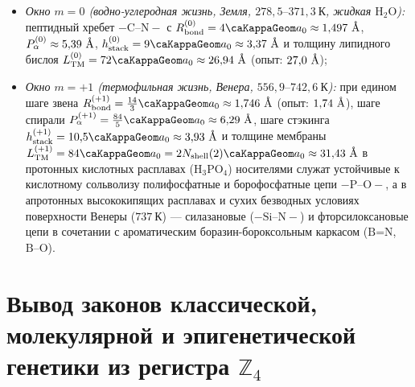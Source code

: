 \begin{theorem}
\begin{enumerate}[leftmargin=*]
\begin{itemize}[noitemsep]
  \item \emph{Окно $m=0$ (водно-углеродная жизнь, Земля, $278{,}5\text{--}371{,}3\ \text{К}$, жидкая $\text{H}_2\text{O}$):} пептидный хребет $-\text{C--N}-$ с $R_{\mathrm{bond}}^{(0)} = 4\caKappaGeom a_0 \approx 1{,}497\ \text{\normalfont\AA}$, $P_\alpha^{(0)} \approx 5{,}39\ \text{\normalfont\AA}$, $h_{\mathrm{stack}}^{(0)} = 9\caKappaGeom a_0 \approx 3{,}37\ \text{\normalfont\AA}$ и толщину липидного бислоя $L_{\mathrm{TM}}^{(0)} = 72\caKappaGeom a_0 \approx 26{,}94\ \text{\normalfont\AA}$ (опыт: $27{,}0\ \text{\normalfont\AA}$);
  \item \emph{Окно $m=+1$ (термофильная жизнь, Венера, $556{,}9\text{--}742{,}6\ \text{К}$):} при едином шаге звена $R_{\mathrm{bond}}^{(+1)} = \frac{14}{3}\caKappaGeom a_0 \approx 1{,}746\ \text{\normalfont\AA}$ (опыт: $1{,}74\ \text{\normalfont\AA}$), шаге спирали $P_\alpha^{(+1)} = \frac{84}{5}\caKappaGeom a_0 \approx 6{,}29\ \text{\normalfont\AA}$, шаге стэкинга $h_{\mathrm{stack}}^{(+1)} = 10{,}5\caKappaGeom a_0 \approx 3{,}93\ \text{\normalfont\AA}$ и толщине мембраны $L_{\mathrm{TM}}^{(+1)} = 84\caKappaGeom a_0 = 2N_{\mathrm{shell}}(2)\caKappaGeom a_0 \approx 31{,}43\ \text{\normalfont\AA}$ в протонных кислотных расплавах ($\text{H}_3\text{PO}_4$) носителями служат устойчивые к кислотному сольволизу полифосфатные и борофосфатные цепи $-\text{P--O}-$, а в апротонных высококипящих расплавах и сухих безводных условиях поверхности Венеры ($737\ \text{К}$) — силазановые ($-\text{Si--N}-$) и фторсилоксановые цепи в сочетании с ароматическим боразин-бороксольным каркасом ($\text{B=N}$, $\text{B--O}$).
  \end{itemize}
\end{enumerate}
\end{theorem}

\section{Вывод законов классической, молекулярной и эпигенетической генетики из регистра \texorpdfstring{$\mathbb{Z}_4$}{Z\_4}}
\label{sec:bio-genetics-laws-from-z4}

